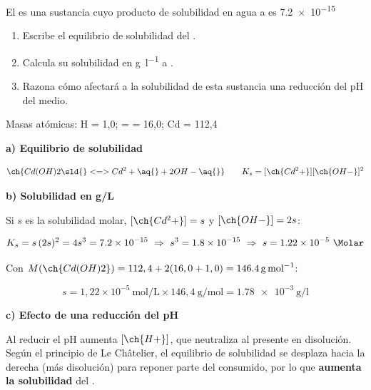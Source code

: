 \begin{exerciseEVAU}
    El es una sustancia cuyo producto de solubilidad en agua a  es \num{7,2e-15}\begin{enumerate}[label=\letraminuscula]
\item Escribe el equilibrio de solubilidad del .
\item Calcula su solubilidad en \si{\g\per\litre} a .
\item Razona cómo afectará a la solubilidad de esta sustancia una reducción del pH del medio.
    \end{enumerate}
    \datos{}Masas atómicas: H = 1,0; = = 16,0; Cd = 112,4

    \begin{solu}

        \textbf{a) Equilibrio de solubilidad}

        \begin{equation*}
            \ch{Cd(OH)2 \sld{} <=> Cd^2+ \aq{} + 2 OH- \aq{}} \qquad K_s = [\ch{Cd^2+}][\ch{OH-}]^2
        \end{equation*}

        \textbf{b) Solubilidad en g/L}

        Si \(s\) es la solubilidad molar, \([\ch{Cd^2+}] = s\) y \([\ch{OH-}] = 2s\):

        \begin{equation*}
            K_s = s\, (2s)^2 = 4 s^3 = \num{7.2e-15} \ \Rightarrow \ s^3 = \num{1.8e-15} \ \Rightarrow \ s = \num{1.22e-5} \ \si{\Molar}
        \end{equation*}

        Con \(M(\ch{Cd(OH)2}) = 112,4 + 2(16,0+1,0) = \SI{146.4}{\gram\per\mole}\):

        \begin{equation*}
            s = 1,22 \times 10^{-5} \ \text{mol/L} \times 146,4 \ \si{\gram\per\mole} = \num{1.78e-3} \ \si{\gram\per\litre}
        \end{equation*}

        \textbf{c) Efecto de una reducción del pH}

        Al reducir el pH aumenta \([\ch{H+}]\), que neutraliza al  presente en disolución. Según el principio de Le Châtelier, el equilibrio de solubilidad se desplaza hacia la derecha (más disolución) para reponer parte del  consumido, por lo que \textbf{aumenta la solubilidad} del .

    \end{solu}


\end{exerciseEVAU}

